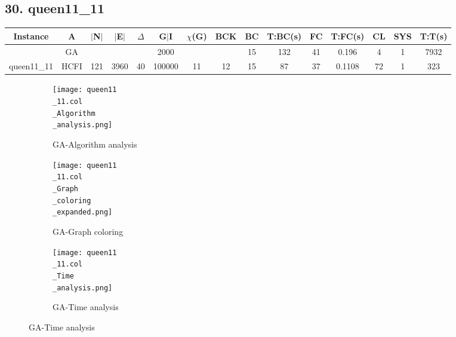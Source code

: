 \documentclass[10pt]{article}
\begin{document}
\subsection*{\hspace{0,9073976cm} 30. queen11\_11 }
\begin{table}[H]
\centering
\begin{tabular}{|c|c|c|c|c|c|c|c|c|c|c|c|c|c|c|}
\hline
Instance& A &$|$N$|$ & $|$E$|$ & $\Delta$ & G$|$I & $\chi$(G) &BCK&BC & T:BC(s) & FC & T:FC(s) & CL & SYS & T:T(s) \\ \hline \hline

	&GA&       &                   &                     &    2000     &     \cellcolor{yellow} & {\cellcolor{yellow}}& {{\cellcolor{green}15}}
&132   &41        &0.196                   &4                    &1          &7932        \\ \cline{2-2} \cline{6-6} \cline{9-15}
 \multirow{-2}{*}{queen11\_11} &HCFI   &\multirow{-2}{*}{121}   &\multirow{-2}{*}{3960}     &\multirow{-2}{*}{40}     &100000     &\multirow{-2}{*}{\cellcolor{yellow}11}      & \multirow{-2}{*}{\cellcolor{yellow}12}    &{\cellcolor{green}15}     &87         &37    &0.1108         &72    &1     &323        \\ \hline 
\end{tabular}
\end{table}
\graphicspath{{./Core1/Solutions/GA/queen11\_11.col}}
\begin{figure}[H]
\begin{subfigure}{.33\textwidth}
  \centering
  \texttt{[image: queen11\\\_11.col\\\_Algorithm\\\_analysis.png]}
  \caption{GA-Algorithm analysis}
   \label{fig:subfig1}
\end{subfigure}%
\begin{subfigure}{.33\textwidth}
  \centering
  \texttt{[image: queen11\\\_11.col\\\_Graph\\\_coloring\\\_expanded.png]}
  \caption{GA-Graph coloring}
  \label{fig:subfig2}
\end{subfigure}
\begin{subfigure}{.33\textwidth}
  \centering
  \texttt{[image: queen11\\\_11.col\\\_Time\\\_analysis.png]}
  \caption{GA-Time analysis}
  \end{subfigure}
\end{figure}
\end{document}
